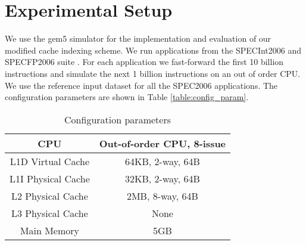 \section{Experimental Setup}
We use the gem5 simulator \cite{binkert2011gem5} for the implementation and evaluation of our modified cache indexing scheme. We run applications from the SPECInt2006 and SPECFP2006 suite \cite{henning2006spec}. For each application we fast-forward the first 10 billion instructions and simulate the next 1 billion instructions on an out of order CPU. We use the reference input dataset for all the SPEC2006 applications. The configuration parameters are shown in Table \ref{table:config_param}.

\begin{table}[h]
	\caption {Configuration parameters}
	\begin{center}
		\begin{tabular}{|c||c|}
			\hline
			CPU & Out-of-order CPU, 8-issue \\
			\hline
			L1D Virtual Cache & 64KB, 2-way, 64B \\
			\hline
			L1I Physical Cache & 32KB, 2-way, 64B \\
			\hline
			L2 Physical Cache & 2MB, 8-way, 64B \\
			\hline
			L3 Physical Cache & None \\
			\hline
			Main Memory & 5GB \\ 
			\hline
		\end{tabular}
	\end{center}
\end{table}
